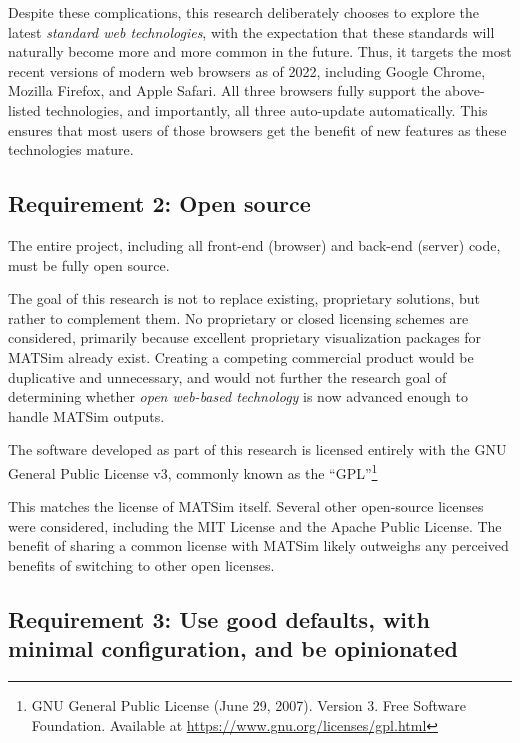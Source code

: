 Despite these complications, this research deliberately chooses to explore the latest \emph{standard web technologies}, with the expectation that these standards will naturally become more and more common in the future. Thus, it targets the most recent versions of modern web browsers as of 2022, including Google Chrome, Mozilla Firefox, and Apple Safari. All three browsers fully support the above-listed technologies, and importantly, all three auto-update automatically. This ensures that most users of those browsers get the benefit of new features as these technologies mature.

\hypertarget{requirement-2-open-source}{%
\subsection{Requirement 2: Open
source}\label{requirement-2-open-source}}

The entire project, including all front-end (browser) and back-end (server) code, must be fully open source.

The goal of this research is not to replace existing, proprietary solutions, but rather to complement them. No proprietary or closed licensing schemes are considered, primarily because excellent proprietary visualization packages for MATSim already exist. Creating a competing commercial product would be duplicative and unnecessary, and would not further the research goal of determining whether \emph{open web-based technology} is now advanced enough to handle MATSim outputs.

The software developed as part of this research is licensed entirely with the GNU General Public License v3, commonly known as the ``GPL''\footnote{GNU General Public License (June 29, 2007). Version 3. Free Software Foundation. Available at \url{https://www.gnu.org/licenses/gpl.html}}

This matches the license of MATSim itself. Several other open-source licenses were considered, including the MIT License and the Apache Public License. The benefit of sharing a common license with MATSim likely outweighs any perceived benefits of switching to other open licenses.

\hypertarget{requirement-3-use-good-defaults-with-minimal-configuration-and-be-opinionated}{%
\subsection{Requirement 3: Use good defaults, with minimal configuration, and be opinionated}\label{requirement-3-use-good-defaults-with-minimal-configuration-and-be-opinionated}}

